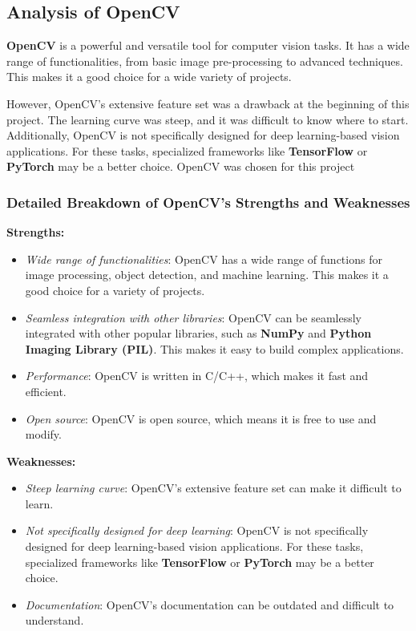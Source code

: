 \subsection{Analysis of OpenCV}

\textbf{OpenCV} is a powerful and versatile tool for computer vision tasks. It has a wide range of functionalities, from basic image pre-processing to advanced techniques. This makes it a good choice for a wide variety of projects.

However, OpenCV's extensive feature set was a drawback at the beginning of this project. The learning curve was steep, and it was difficult to know where to start. Additionally, OpenCV is not specifically designed for deep learning-based vision applications. For these tasks, specialized frameworks like \textbf{TensorFlow} or \textbf{PyTorch} may be a better choice. OpenCV was chosen for this project

\subsubsection{Detailed Breakdown of OpenCV's Strengths and Weaknesses}

\textbf{Strengths:}
\begin{itemize}
    \item \textit{Wide range of functionalities}: OpenCV has a wide range of functions for image processing, object detection, and machine learning. This makes it a good choice for a variety of projects.
    \item \textit{Seamless integration with other libraries}: OpenCV can be seamlessly integrated with other popular libraries, such as \textbf{NumPy} and \textbf{Python Imaging Library (PIL)}. This makes it easy to build complex applications.
    \item \textit{Performance}: OpenCV is written in C/C++, which makes it fast and efficient.
    \item \textit{Open source}: OpenCV is open source, which means it is free to use and modify.
\end{itemize}

\textbf{Weaknesses:}
\begin{itemize}
    \item \textit{Steep learning curve}: OpenCV's extensive feature set can make it difficult to learn.
    \item \textit{Not specifically designed for deep learning}: OpenCV is not specifically designed for deep learning-based vision applications. For these tasks, specialized frameworks like \textbf{TensorFlow} or \textbf{PyTorch} may be a better choice.
    \item \textit{Documentation}: OpenCV's documentation can be outdated and difficult to understand.
\end{itemize}

